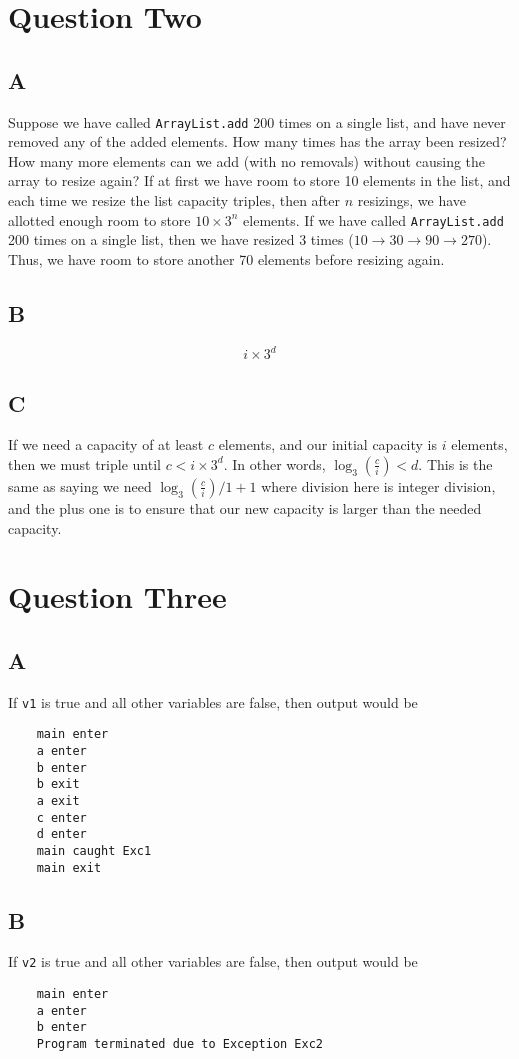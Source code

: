 \documentclass[11pt,letterpaper]{article}
\begin{document}
\section{Question Two} 
\subsection*{A}
Suppose we have called \texttt{ArrayList.add} 200 times on a single list, and have never removed any of the added elements. How many times has the array been resized? How many more elements can we add (with no removals) without causing the array to resize again?
If at first we have room to store 10 elements in the list, and each time we resize the list capacity triples, then after $n$ resizings, we have allotted enough room to store $10\times3^n$ elements. If we have called \texttt{ArrayList.add} 200 times on a single list, then we have resized 3 times ($10\rightarrow 30\rightarrow 90\rightarrow 270$). Thus, we have room to store another 70 elements before resizing again.
\subsection*{B}
$$i \times 3^d$$
\subsection*{C}
If we need a capacity of at least $c$ elements, and our initial capacity is $i$ elements, then we must triple until $ c < i\times 3^d$. In other words, $\log_3 (\frac{c}{i}) < d$. This is the same as saying we need $\log_3 (\frac{c}{i})/1 +1$ where division here is integer division, and the plus one is to ensure that our new capacity is larger than the needed capacity. 




\section{Question Three}
\subsection*{A}
If \texttt{v1} is true and all other variables are false, then output would be 
\begin{lstlisting}
	main enter
	a enter
	b enter
	b exit
	a exit
	c enter
	d enter
	main caught Exc1
	main exit
\end{lstlisting}

\subsection*{B}
If \texttt{v2} is true and all other variables are false, then output would be
\begin{lstlisting}
	main enter
	a enter
	b enter
	Program terminated due to Exception Exc2
\end{lstlisting}
\end{document}
